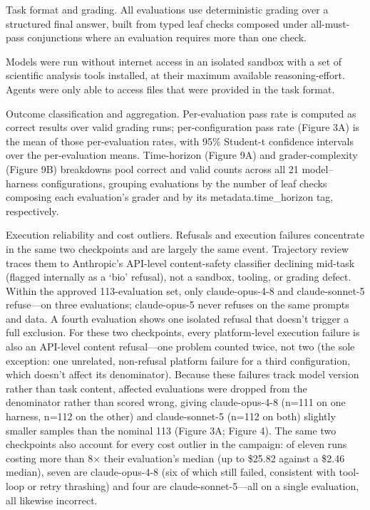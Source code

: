 \documentclass[11pt]{article}
\begin{document}
Task format and grading. All evaluations use deterministic grading over a structured final answer, built from typed leaf checks composed under all-must-pass conjunctions where an evaluation requires more than one check.

Models were run without internet access in an isolated sandbox with a set of scientific analysis tools installed, at their maximum available reasoning-effort. Agents were only able to access files that were provided in the task format.   

Outcome classification and aggregation. Per-evaluation pass rate is computed as correct results over valid grading runs; per-configuration pass rate (Figure 3A) is the mean of those per-evaluation rates, with 95\% Student-t confidence intervals over the per-evaluation means. Time-horizon (Figure 9A) and grader-complexity (Figure 9B) breakdowns pool correct and valid counts across all 21 model--harness configurations, grouping evaluations by the number of leaf checks composing each evaluation's grader and by its metadata.time\_horizon tag, respectively.

Execution reliability and cost outliers. Refusals and execution failures concentrate in the same two checkpoints and are largely the same event. Trajectory review traces them to Anthropic's API-level content-safety classifier declining mid-task (flagged internally as a `bio' refusal), not a sandbox, tooling, or grading defect. Within the approved 113-evaluation set, only claude-opus-4-8 and claude-sonnet-5 refuse---on three evaluations; claude-opus-5 never refuses on the same prompts and data. A fourth evaluation shows one isolated refusal that doesn't trigger a full exclusion. For these two checkpoints, every platform-level execution failure is also an API-level content refusal---one problem counted twice, not two (the sole exception: one unrelated, non-refusal platform failure for a third configuration, which doesn't affect its denominator). Because these failures track model version rather than task content, affected evaluations were dropped from the denominator rather than scored wrong, giving claude-opus-4-8 (n=111 on one harness, n=112 on the other) and claude-sonnet-5 (n=112 on both) slightly smaller samples than the nominal 113 (Figure 3A; Figure 4). The same two checkpoints also account for every cost outlier in the campaign: of eleven runs costing more than 8$\times$ their evaluation's median (up to \$25.82 against a \$2.46 median), seven are claude-opus-4-8 (six of which still failed, consistent with tool-loop or retry thrashing) and four are claude-sonnet-5---all on a single evaluation, all likewise incorrect.
\end{document}
